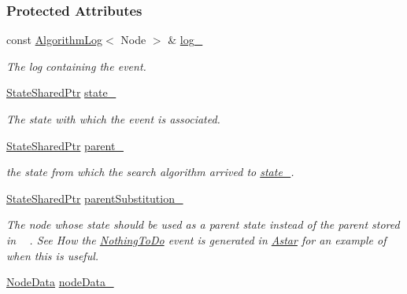 \subsubsection*{Protected Attributes}
\begin{DoxyCompactItemize}
\item 
const \hyperlink{structAlgorithmLog}{Algorithm\+Log}$<$ Node $>$ \& \hyperlink{structEventBase_a4246cc359144ed29b9c2065e411018ec}{log\+\_\+}\hypertarget{structEventBase_a4246cc359144ed29b9c2065e411018ec}{}\label{structEventBase_a4246cc359144ed29b9c2065e411018ec}

\begin{DoxyCompactList}\small\item\em The log containing the event. \end{DoxyCompactList}\item 
\hyperlink{structEventBase_a2c0edb5cda08ce1965f3440a97b3fc87}{State\+Shared\+Ptr} \hyperlink{structEventBase_a59a84774ce3c5e978e1606852ed67cf7}{state\+\_\+}\hypertarget{structEventBase_a59a84774ce3c5e978e1606852ed67cf7}{}\label{structEventBase_a59a84774ce3c5e978e1606852ed67cf7}

\begin{DoxyCompactList}\small\item\em The state with which the event is associated. \end{DoxyCompactList}\item 
\hyperlink{structEventBase_a2c0edb5cda08ce1965f3440a97b3fc87}{State\+Shared\+Ptr} \hyperlink{structEventBase_a7c57b6eb54126171159add542781dd3f}{parent\+\_\+}\hypertarget{structEventBase_a7c57b6eb54126171159add542781dd3f}{}\label{structEventBase_a7c57b6eb54126171159add542781dd3f}

\begin{DoxyCompactList}\small\item\em the state from which the search algorithm arrived to \hyperlink{structEventBase_a59a84774ce3c5e978e1606852ed67cf7}{state\+\_\+}. \end{DoxyCompactList}\item 
\hyperlink{structEventBase_a2c0edb5cda08ce1965f3440a97b3fc87}{State\+Shared\+Ptr} \hyperlink{structEventBase_a93cf6c5dcf8d477ca182c655e66f1536}{parent\+Substitution\+\_\+}\hypertarget{structEventBase_a93cf6c5dcf8d477ca182c655e66f1536}{}\label{structEventBase_a93cf6c5dcf8d477ca182c655e66f1536}

\begin{DoxyCompactList}\small\item\em The node whose state should be used as a parent state instead of the parent stored in ~\newline
. See How the \hyperlink{structNothingToDo}{Nothing\+To\+Do} event is generated in \hyperlink{structAstar}{Astar} for an example of when this is useful. \end{DoxyCompactList}\item 
\hyperlink{structEventBase_a98e31769d6ef4ed8b3f5f0d13cce997b}{Node\+Data} \hyperlink{structEventBase_acfafa01b932b572c2ca304fcdfe129ad}{node\+Data\+\_\+}\hypertarget{structEventBase_acfafa01b932b572c2ca304fcdfe129ad}{}\label{structEventBase_acfafa01b932b572c2ca304fcdfe129ad}


\end{DoxyCompactItemize}
